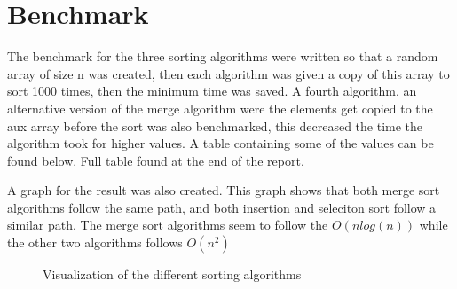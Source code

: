 \documentclass[a4paper,11pt]{article}
\begin{document}
\section*{Benchmark}
The benchmark for the three sorting algorithms were written so that a random array of size n was created, then each algorithm was
given a copy of this array to sort 1000 times, then the minimum time was saved. A fourth algorithm, an alternative version of
the merge algorithm were the elements get copied to the aux array before the sort was also benchmarked, this decreased the time the algorithm took for higher values. A table containing some of the 
values can be found below. Full table found at the end of the report.

\begin{table}[h]
    \begin{center}
    \caption{The results of the benchmark for the different sorting algorithms}
    \label{tab:table1}
    \end{center}
\end{table}

\noindent
A graph for the result was also created. This graph shows that both merge sort algorithms follow the same path, and both insertion and seleciton sort follow a similar path. 
The merge sort algorithms seem to follow the $O(nlog(n))$ while the other two algorithms follows $O(n^2)$
\begin{figure}[h]
    \centering    
    
    \scalebox{0.75}{}
    \caption{Visualization of the different sorting algorithms}   
    \label{tab:figure1} 
    
    \end{figure}
\end{document}
